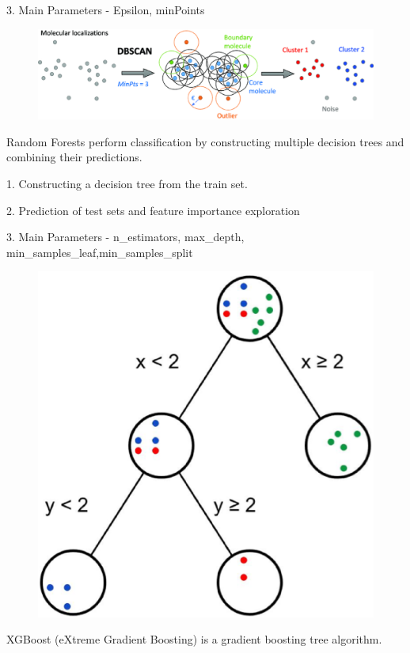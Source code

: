 3. Main Parameters - Epsilon, minPoints
	\begin{figure}[H]
	\centering
{}
\includegraphics[scale=0.4]{dbscan.eps}
\end{figure}
Random Forests perform classification by constructing multiple decision trees and combining their predictions.

1. Constructing a decision tree from the train set.

2. Prediction of test sets and feature importance exploration

3. Main Parameters - n\_estimators, max\_depth, min\_samples\_leaf,min\_samples\_split
	\begin{figure}[H]
	\centering
	\includegraphics[scale=0.3]{rf.eps}
\end{figure}
XGBoost (eXtreme Gradient Boosting) is a gradient boosting tree algorithm.

